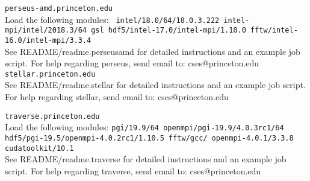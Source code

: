 \texttt{perseus-amd.princeton.edu}
\\
Load the following modules:
\texttt{
intel/18.0/64/18.0.3.222		intel-mpi/intel/2018.3/64		gsl
hdf5/intel-17.0/intel-mpi/1.10.0	fftw/intel-16.0/intel-mpi/3.3.4
}\\
See README/readme.perseusamd for detailed instructions and an example job script.
\newline\newline
For help regarding perseus, send email to:  cses@princeton.edu
\texttt{stellar.princeton.edu}
\\
See README/readme.stellar for detailed instructions and an example job script.
\\
For help regarding stellar, send email to:  cses@princeton.edu

\texttt{traverse.princeton.edu}
\\
Load the following modules:
\texttt{pgi/19.9/64		openmpi/pgi-19.9/4.0.3rc1/64 		hdf5/pgi-19.5/openmpi-4.0.2rc1/1.10.5
fftw/gcc/ openmpi-4.0.1/3.3.8		cudatoolkit/10.1
}\\
See README/readme.traverse for detailed instructions and an example job script.
\newline\newline
For help regarding traverse, send email to:  cses@princeton.edu

